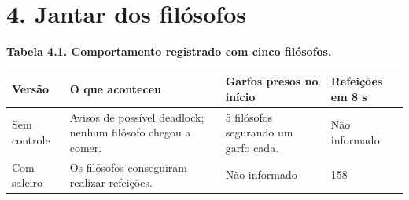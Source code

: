 \documentclass[11pt,a4paper]{article}
\begin{document}
\clearpage
\section*{4. Jantar dos filósofos}
{\small\textbf{Tabela 4.1. Comportamento registrado com cinco filósofos.}\par}\nopagebreak
{\small\begin{tabularx}{\textwidth}{|L{1.75cm}|Y|Y|L{2cm}|}\hline
{}\textbf{Versão} & \textbf{O que aconteceu} & \textbf{Garfos presos no início} & \textbf{Refeições em 8 s}\\\hline
Sem controle & Avisos de possível deadlock; nenhum filósofo chegou a comer. & 5 filósofos segurando um garfo cada. & Não informado\\\hline
Com saleiro & Os filósofos conseguiram realizar refeições. & Não informado & 158\\\hline
\end{tabularx}}\par\vspace{3pt}
\end{document}
